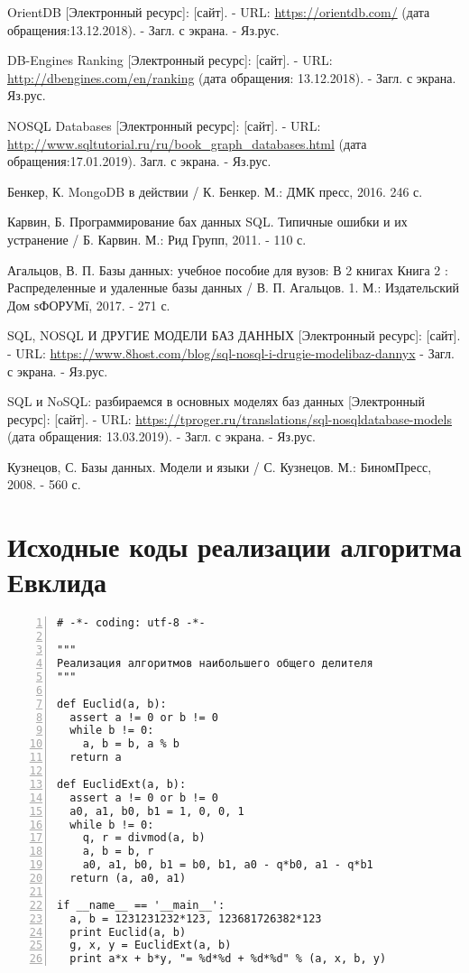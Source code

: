 \documentclass[14pt]{extreport}
\begin{document}
\begin{thebibliography}{99}
 OrientDB [Электронный ресурс]: [сайт]. - URL: \url{https://orientdb.com/} (дата обращения:13.12.2018). - Загл. с экрана. - Яз.рус.

 DB-Engines Ranking [Электронный ресурс]: [сайт]. - 
URL: \url{http://dbengines.com/en/ranking} (дата обращения: 13.12.2018). - Загл. с экрана. Яз.рус.

 NOSQL Databases [Электронный ресурс]: [сайт]. - URL: 
\url{http://www.sqltutorial.ru/ru/book_graph_databases.html} (дата обращения:17.01.2019). Загл. с экрана. - Яз.рус.

 Бенкер, К. MongoDB в действии / К. Бенкер.  М.: ДМК пресс, 2016. 246 с.


 Карвин, Б. Программирование бах данных SQL. Типичные ошибки и их
устранение / Б. Карвин.  М.: Рид Групп, 2011. - 110 с.

 Агальцов, В. П. Базы данных: учебное пособие для вузов: В 2 книгах
Книга 2 : Распределенные и удаленные базы данных / В. П. Агальцов. 1.  М.: Издательский Дом ѕФОРУМї, 2017. - 271 с.

 SQL, NOSQL И ДРУГИЕ МОДЕЛИ БАЗ ДАННЫХ [Электронный ресурс]: [сайт]. - URL:
\url{https://www.8host.com/blog/sql-nosql-i-drugie-modelibaz-dannyx} - Загл. с экрана. - Яз.рус.

 SQL и NoSQL: разбираемся в основных моделях баз данных [Электронный ресурс]: [сайт]. - 
URL: \url{https://tproger.ru/translations/sql-nosqldatabase-models} (дата обращения: 13.03.2019). - Загл. с экрана. - Яз.рус.

 Кузнецов, С. Базы данных. Модели и языки / С. Кузнецов.  М.: БиномПресс, 2008. - 560 с.
\end{thebibliography}


\Appendix %

\chapter{Исходные коды реализации алгоритма Евклида}
\begin{Verbatim}[fontsize=\small,numbers=left,firstnumber=1,stepnumber=1]
# -*- coding: utf-8 -*-

"""
Реализация алгоритмов наибольшего общего делителя
"""

def Euclid(a, b):
  assert a != 0 or b != 0
  while b != 0:
    a, b = b, a % b
  return a

def EuclidExt(a, b):
  assert a != 0 or b != 0
  a0, a1, b0, b1 = 1, 0, 0, 1
  while b != 0:
    q, r = divmod(a, b)
    a, b = b, r
    a0, a1, b0, b1 = b0, b1, a0 - q*b0, a1 - q*b1
  return (a, a0, a1)

if __name__ == '__main__':
  a, b = 1231231232*123, 123681726382*123
  print Euclid(a, b)
  g, x, y = EuclidExt(a, b)
  print a*x + b*y, "= %d*%d + %d*%d" % (a, x, b, y)
\end{Verbatim}
\end{document}
